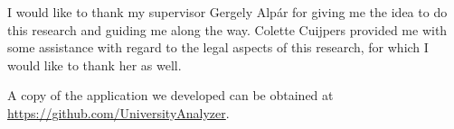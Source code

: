 I would like to thank my supervisor Gergely Alp\'{a}r for giving me the idea to do this research and guiding me along the way. Colette Cuijpers provided me with some assistance with regard to the legal aspects of this research, for which I would like to thank her as well.

A copy of the application we developed can be obtained at \url{https://github.com/UniversityAnalyzer}.